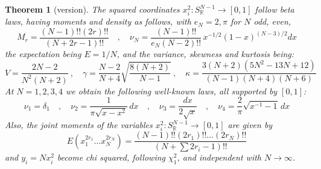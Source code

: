 \documentclass[12pt]{amsbook}
\newtheorem{theorem}{Theorem}[chapter]
\begin{document}
\begin{theorem}[version]
The squared coordinates $x_i^2:S^{N-1}_\mathbb R\to[0,1]$ follow beta laws, having moments and density as follows, with $e_N=2,\pi$ for $N$ odd, even,
$$M_r=\frac{(N-1)!!(2r)!!}{(N+2r-1)!!}\quad,\quad\nu_N=\frac{(N-1)!!}{e_N(N-2)!!}\,x^{-1/2}(1-x)^{(N-3)/2}dx$$
the expectation being $E=1/N$, and the variance, skewness and kurtosis being:
$$V=\frac{2N-2}{N^2(N+2)}\ ,\quad 
\gamma=\frac{N-2}{N+4}\sqrt{\frac{8(N+2)}{N-1}}\ ,\quad 
\kappa=\frac{3(N+2)(5N^2-13N+12)}{(N-1)(N+4)(N+6)}$$
At $N=1,2,3,4$ we obtain the following well-known laws, all supported by $[0,1]$:
$$\nu_1=\delta_1\quad,\quad\nu_2=\frac{1}{\pi\sqrt{x-x^2}}\,dx
\quad,\quad\nu_3=\frac{dx}{2\sqrt{x}}\quad,\quad\nu_4=\frac{2}{\pi}\sqrt{x^{-1}-1}\,dx$$
Also, the joint moments of the variables $x_i^2:S^{N-1}_\mathbb R\to[0,1]$ are given by
$$E(x_1^{2r_1}\ldots x_N^{2r_N})=\frac{(N-1)!!(2r_1)!!\ldots(2r_N)!!}{(N+\sum 2r_i-1)!!}$$
and $y_i=Nx_i^2$ become chi squared, following $\chi_1^2$, and independent with $N\to\infty$.
\end{theorem}
\end{document}
